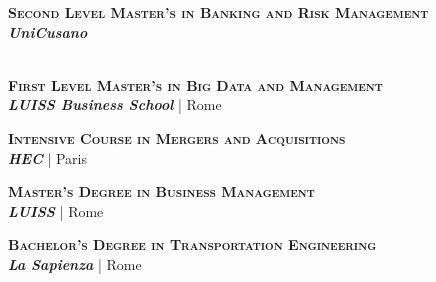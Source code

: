 
\textsc{\textbf{Second Level Master’s in Banking and Risk Management}} \\ 
\textbf{\textit{UniCusano}} %
\\
 \\ 

\is
\textsc{\textbf{First Level Master’s in Big Data and Management}} \\ 
\textbf{\textit{LUISS Business School}} | Rome %
\\

\is
\textsc{\textbf{Intensive Course in Mergers and Acquisitions}} \\ 
\textbf{\textit{HEC}} | Paris %

\is
\textsc{\textbf{Master’s Degree in Business Management}} \\ 
\textbf{\textit{LUISS}} | Rome %
\\

\is
\textsc{\textbf{Bachelor’s Degree in Transportation Engineering}} \\ 
\textbf{\textit{La Sapienza}} | Rome %
\\
